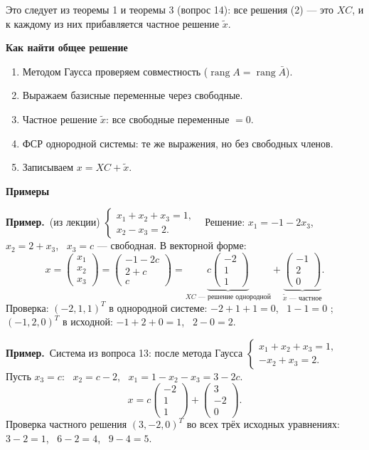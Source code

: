 \documentclass[a4paper,11pt]{article}
\DeclareMathOperator{\rang}{rang}
\newcommand{\prim}{\par\smallskip\noindent\textbf{\textcolor{teoc!80!black}{Пример.}}\ }
\newcommand{\podr}[1]{\par\needspace{8\baselineskip}\medskip
  {\large\bfseries\textcolor{oprc!80!black}{#1}}\par\nopagebreak\smallskip}
\begin{document}
Это следует из теоремы 1 и теоремы 3 (вопрос 14): все решения (2) --- это $XC$, и к каждому из них прибавляется частное решение $\tilde x$.

\podr{Как найти общее решение}

\begin{enumerate}[leftmargin=*]
  \item Методом Гаусса проверяем совместность ($\rang A = \rang \bar A$).
  \item Выражаем базисные переменные через свободные.
  \item Частное решение $\tilde x$: все свободные переменные $= 0$.
  \item ФСР однородной системы: те же выражения, но без свободных членов.
  \item Записываем $x = XC + \tilde x$.
\end{enumerate}

\podr{Примеры}

\prim (из лекции) $\begin{cases} x_1 + x_2 + x_3 = 1, \\ x_2 - x_3 = 2. \end{cases}$ \
Решение: $x_1 = -1 - 2x_3$, $x_2 = 2 + x_3$, \ $x_3 = c$ --- свободная. В векторной форме:
\[
  x = \begin{pmatrix} x_1 \\ x_2 \\ x_3 \end{pmatrix} = \begin{pmatrix} -1 - 2c \\ 2 + c \\ c \end{pmatrix}
  = \underbrace{c \begin{pmatrix} -2 \\ 1 \\ 1 \end{pmatrix}}_{XC \text{ --- решение однородной}}
  + \underbrace{\begin{pmatrix} -1 \\ 2 \\ 0 \end{pmatrix}}_{\tilde x \text{ --- частное}}.
\]
Проверка: $(-2, 1, 1)^T$ в однородной системе: $-2 + 1 + 1 = 0$, \ $1 - 1 = 0$ \checkmark;
$(-1, 2, 0)^T$ в исходной: $-1 + 2 + 0 = 1$, \ $2 - 0 = 2$. \checkmark

\prim Система из вопроса 13: после метода Гаусса
$\begin{cases} x_1 + x_2 + x_3 = 1, \\ -x_2 + x_3 = 2. \end{cases}$
Пусть $x_3 = c$: \ $x_2 = c - 2$, \ $x_1 = 1 - x_2 - x_3 = 3 - 2c$.
\[
  x = c \begin{pmatrix} -2 \\ 1 \\ 1 \end{pmatrix} + \begin{pmatrix} 3 \\ -2 \\ 0 \end{pmatrix}.
\]
Проверка частного решения $(3, -2, 0)^T$ во всех трёх исходных уравнениях: $3 - 2 = 1$, \ $6 - 2 = 4$, \ $9 - 4 = 5$. \checkmark
\end{document}
